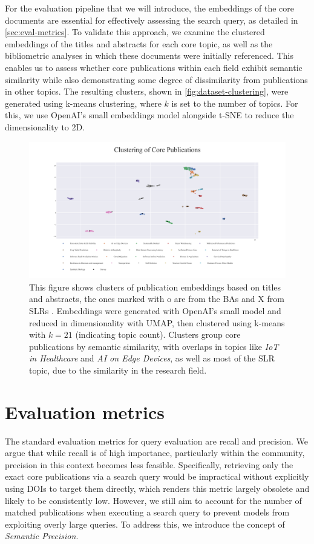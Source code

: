 For the evaluation pipeline that we will introduce, the embeddings of the core documents are essential for effectively assessing the search query, as detailed in \autoref{sec:eval-metrics}. To validate this approach, we examine the clustered embeddings of the titles and abstracts for each core topic, as well as the bibliometric analyses in which these documents were initially referenced. This enables us to assess whether core publications within each field exhibit semantic similarity while also demonstrating some degree of dissimilarity from publications in other topics. The resulting clusters, shown in \autoref{fig:dataset-clustering}, were generated using k-means clustering, where $k$ is set to the number of topics. For this, we use OpenAI's small embeddings model alongside t-SNE\autocite{van2008visualizing} to reduce the dimensionality to 2D.

\begin{figure}
	\centering	
	\includegraphics[scale=0.6]{pics/umap_clustering.pdf}
	\caption[Core Publications Clustering]{This figure shows clusters of publication embeddings based on titles and abstracts, the ones marked with o are from the BAs and X from SLRs . Embeddings were generated with OpenAI's small model and reduced in dimensionality with UMAP, then clustered using k-means with $k=21$ (indicating topic count). Clusters group core publications by semantic similarity, with overlaps in topics like \textit{IoT in Healthcare} and \textit{AI on Edge Devices}, as well as most of the SLR topic, due to the similarity in the research field.}
	\label{fig:dataset-clustering}
\end{figure}

\section{Evaluation metrics}\label{sec:eval-metrics}
The standard evaluation metrics for query evaluation are recall and precision. We argue that while recall is of high importance, particularly within the community, precision in this context becomes less feasible. Specifically, retrieving only the exact core publications via a search query would be impractical without explicitly using DOIs to target them directly, which renders this metric largely obsolete and likely to be consistently low. However, we still aim to account for the number of matched publications when executing a search query to prevent models from exploiting overly large queries. To address this, we introduce the concept of \textit{Semantic Precision}.

